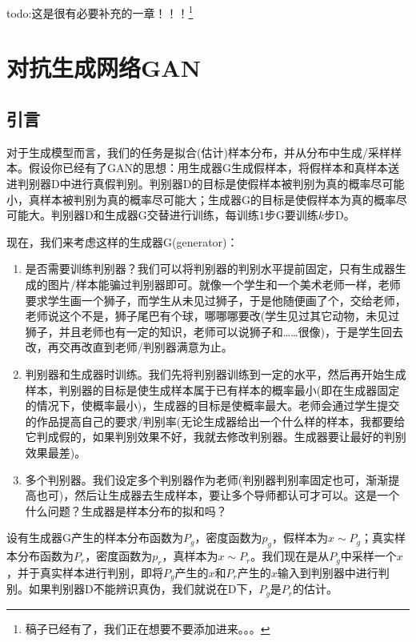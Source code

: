 
    todo:这是很有必要补充的一章！！！\footnote{稿子已经有了，我们正在想要不要添加进来。。。}


\section{对抗生成网络GAN}
    \subsection{引言}
        \par
        对于生成模型而言，我们的任务是拟合(估计)样本分布，并从分布中生成/采样样本。假设你已经有了GAN的思想：用生成器G生成假样本，将假样本和真样本送进判别器D中进行真假判别。判别器D的目标是使假样本被判别为真的概率尽可能小，真样本被判别为真的概率尽可能大；生成器G的目标是使假样本为真的概率尽可能大。判别器D和生成器G交替进行训练，每训练1步G要训练$k$步D。
        \par
        现在，我们来考虑这样的生成器G(generator)：
        \begin{enumerate}
        \item 是否需要训练判别器？我们可以将判别器的判别水平提前固定，只有生成器生成的图片/样本能骗过判别器即可。就像一个学生和一个美术老师一样，老师要求学生画一个狮子，而学生从未见过狮子，于是他随便画了个，交给老师，老师说这个不是，狮子尾巴有个球，哪哪哪要改(学生见过其它动物，未见过狮子，并且老师也有一定的知识，老师可以说狮子和……很像)，于是学生回去改，再交再改直到老师/判别器满意为止。
        \item 判别器和生成器时训练。我们先将判别器训练到一定的水平，然后再开始生成样本，判别器的目标是使生成样本属于已有样本的概率最小(即在生成器固定的情况下，使概率最小)，生成器的目标是使概率最大。老师会通过学生提交的作品提高自己的要求/判别率(无论生成器给出一个什么样的样本，我都要给它判成假的，如果判别效果不好，我就去修改判别器。生成器要让最好的判别效果最差)。
        \item 多个判别器。我们设定多个判别器作为老师(判别器判别率固定也可，渐渐提高也可)，然后让生成器去生成样本，要让多个导师都认可才可以。这是一个什么问题？生成器是样本分布的拟和吗？
        \end{enumerate}
        \par
        设有生成器G产生的样本分布函数为$P_g$，密度函数为$p_g$，假样本为$x\sim P_g$；真实样本分布函数为$P_r$，密度函数为$p_r$，真样本为$x\sim P_r$。我们现在是从$P_g$中采样一个$x$，并于真实样本进行判别，即将$P_g$产生的$x$和$P_r$产生的$x$输入到判别器中进行判别。如果判别器D不能辨识真伪，我们就说在D下，$P_g$是$P_r$的估计。
